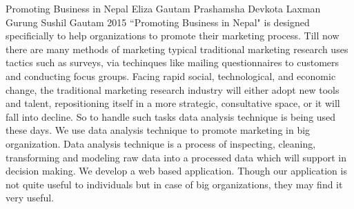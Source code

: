  \begin{conf-abstract}[]
{Promoting Business in Nepal}
{
 Eliza Gautam
 Prashamsha Devkota
 Laxman Gurung
 Sushil Gautam
}
{2015}
``Promoting Business in Nepal" is designed specificially to help organizations to promote their marketing process. Till now there are many methods of marketing typical traditional marketing research uses tactics such as surveys, via techinques like mailing questionnaires to customers and conducting focus groups. Facing rapid social, technological, and economic change, the traditional marketing research industry will either adopt new tools and talent, repositioning itself in a more strategic, consultative space, or it will fall into decline. So to handle such tasks data analysis technique is being used these days. We use data analysis technique to promote marketing in big organization. Data analysis technique is a process of inspecting, cleaning, transforming and modeling raw data into a processed data which will support in decision making. We develop a web based application. Though our application is not quite useful to individuals but in case of big organizations, they may find it very useful. 
  \end{conf-abstract}